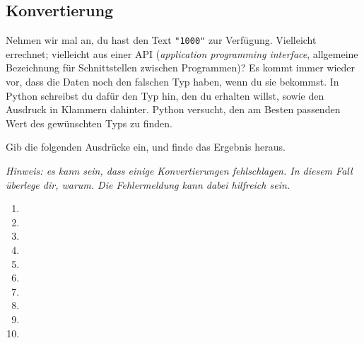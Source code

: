 \subsection{Konvertierung}

Nehmen wir mal an, du hast den Text \texttt{"1000"} zur Verfügung. Vielleicht
errechnet; vielleicht aus einer API (\textit{application programming interface}, allgemeine Bezeichnung für Schnittstellen zwischen Programmen)? Es kommt immer wieder vor, dass die Daten
noch den falschen Typ haben, wenn du sie bekommst. In Python schreibst du dafür
den Typ hin, den du erhalten willst, sowie den Ausdruck in Klammern dahinter.
Python versucht, den am Besten passenden Wert des gewünschten Typs zu finden.

Gib die folgenden Ausdrücke ein, und finde das Ergebnis heraus.

\textit{Hinweis: es kann sein, dass einige Konvertierungen fehlschlagen. In diesem Fall überlege dir, warum. Die Fehlermeldung kann dabei hilfreich sein.}

\begin{multicols}{3}
    \begin{enumerate}
        \item {}
        \item {}
        \item {}
        \item {}
        \item {}
        \item {}
        \item {}
        \item {}
        \item {}
        \item {}
    \end{enumerate}
\end{multicols}
